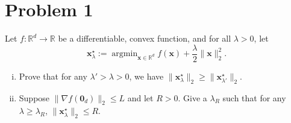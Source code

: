 \section*{Problem 1}

Let $f : \mathbb{R}^d \to \mathbb{R}$ be a differentiable, convex function, and for all $\lambda > 0$, let
\[
\mathbf{x}_\lambda^\star := \operatorname{argmin}_{\mathbf{x} \in \mathbb{R}^d} f(\mathbf{x}) + \frac{\lambda}{2} \|\mathbf{x}\|_2^2.
\]

\begin{enumerate}[(i)]
\item Prove that for any $\lambda' > \lambda > 0$, we have $\|\mathbf{x}_\lambda^\star\|_2 \geq \|\mathbf{x}_{\lambda'}^\star\|_2$.
\item Suppose $\|\nabla f(\mathbf{0}_d)\|_2 \leq L$ and let $R > 0$. Give a $\lambda_R$ such that for any $\lambda \geq \lambda_R$, $\|\mathbf{x}_\lambda^\star\|_2 \leq R$.
\end{enumerate}
